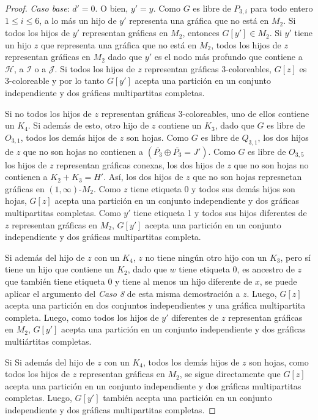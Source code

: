 \begin{proof}
\emph{Caso base}: $d'=0$. O bien, $y'=y$.
Como $G$ es libre de $P_{3,i}$ para todo entero $1\le i \le 6$, a lo más un hijo de $y'$ representa una gráfica que no está en $M_2$. Si todos los hijos de $y'$ representan gráficas en $M_2$, entonces $G[y']\in M_2$. Si $y'$ tiene un hijo $z$ que representa una gráfica que no está en $M_2$, todos los hijos de $z$ representan gráficas en $M_2$ dado que $y'$ es el nodo más profundo que contiene a $\mathcal{H}$, a $\mathcal{I}$ o a $\mathcal{J}$. Si todos los hijos de $z$ representan gráficas 3-coloreables, $G[z]$ es 3-coloreable y por lo tanto $G[y']$ acepta una partición en un conjunto independiente y dos gráficas multipartitas completas. 

Si no todos los hijos de $z$ representan gráficas 3-coloreables, uno de ellos contiene un $K_4$. Si además de esto, otro hijo de $z$ contiene un $K_3$, dado que $G$ es libre de $O_{3,1}$, todos los demás hijos de $z$ son hojas. Como $G$ es libre de $Q_{3,1}$, los dos hijos de $z$ que no son hojas no contienen a $(\overline{P_3}\oplus\overline{P_3}=J')$. Como $G$ es libre de $O_{3,5}$ los hijos de $z$ representan gráficas conexas, los dos hijos de $z$ que no son hojas no contienen a $K_2+K_3=H'$. Así, los dos hijos de $z$ que no son hojas represnetan gráficas en $(1,\infty)$-$M_2$. Como $z$ tiene etiqueta 0 y todos sus demás hijos son hojas, $G[z]$ acepta una partición en un conjunto independiente y dos gráficas multipartitas completas. Como $y'$ tiene etiqueta 1 y todos sus hijos diferentes de $z$ representan gráficas en $M_2$, $G[y']$ acepta una partición en un conjunto independiente y dos gráficas multipartitas completa. 

Si además del hijo de $z$ con un $K_4$, $z$ no tiene ningún otro hijo con un $K_3$, pero sí tiene un hijo que contiene un $K_2$, dado que $w$ tiene etiqueta 0, es ancestro de $z$ que también tiene etiqueta 0 y tiene al menos un hijo diferente de $x$, se puede aplicar el argumento del \emph{Caso 8} de esta misma demostración a $z$. Luego, $G[z]$ acepta una partición en dos conjuntos independientes y una gráfica multipartita completa. Luego, como todos los hijos de $y'$ diferentes de $z$ representan gráficas en $M_2$, $G[y']$ acepta una partición en un conjunto independiente y dos gráficas multiártitas completas.

Si Si además del hijo de $z$ con un $K_4$, todos los demás hijos de $z$ son hojas, como todos los hijos de $z$ representan gráficas en $M_2$, se sigue directamente que $G[z]$ acepta una partición en un conjunto independiente y dos gráficas multipartitas completas. Luego, $G[y']$ también acepta una partición en un conjunto independiente y dos gráficas multipartitas completas.


\end{proof}
